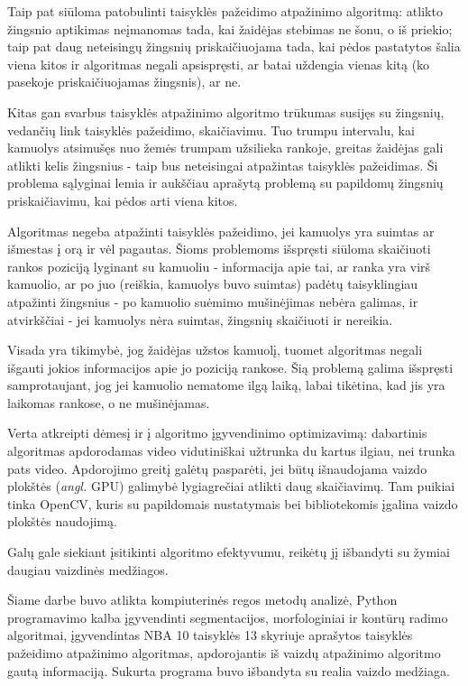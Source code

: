 \documentclass{VUMIFPSkursinis}
\begin{document}
Taip pat siūloma patobulinti taisyklės pažeidimo atpažinimo algoritmą: atlikto žingsnio aptikimas neįmanomas tada, kai žaidėjas stebimas ne šonu, o iš priekio; taip pat daug neteisingų žingsnių priskaičiuojama tada, kai pėdos pastatytos šalia viena kitos ir algoritmas negali apsispręsti, ar batai uždengia vienas kitą (ko pasekoje priskaičiuojamas žingsnis), ar ne.

Kitas gan svarbus taisyklės atpažinimo algoritmo trūkumas susijęs su žingsnių, vedančių link taisyklės pažeidimo, skaičiavimu. Tuo trumpu intervalu, kai kamuolys atsimušęs nuo žemės trumpam užsilieka rankoje, greitas žaidėjas gali atlikti kelis žingsnius - taip bus neteisingai atpažintas taisyklės pažeidimas. Ši problema sąlyginai lemia ir aukščiau aprašytą problemą su papildomų žingsnių priskaičiavimu, kai pėdos arti viena kitos.

Algoritmas negeba atpažinti taisyklės pažeidimo, jei kamuolys yra suimtas ar išmestas į orą ir vėl pagautas. Šioms problemoms išspręsti siūloma skaičiuoti rankos poziciją lyginant su kamuoliu - informacija apie tai, ar ranka yra virš kamuolio, ar po juo (reiškia, kamuolys buvo suimtas) padėtų taisyklingiau atpažinti žingsnius - po kamuolio suėmimo mušinėjimas nebėra galimas, ir atvirkščiai - jei kamuolys nėra suimtas, žingsnių skaičiuoti ir nereikia. 

Visada yra tikimybė, jog žaidėjas užstos kamuolį, tuomet algoritmas negali išgauti jokios informacijos apie jo poziciją rankose. Šią problemą galima išspręsti samprotaujant, jog jei kamuolio nematome ilgą laiką, labai tikėtina, kad jis yra laikomas rankose, o ne mušinėjamas. 

Verta atkreipti dėmesį ir į algoritmo įgyvendinimo optimizavimą: dabartinis algoritmas apdorodamas video vidutiniškai užtrunka du kartus ilgiau, nei trunka pats video. Apdorojimo greitį galėtų pasparėti, jei būtų išnaudojama vaizdo plokštės (\textit{angl.} GPU) galimybė lygiagrečiai atlikti daug skaičiavimų. Tam puikiai tinka OpenCV, kuris su papildomais nustatymais bei bibliotekomis įgalina vaizdo plokštės naudojimą. 

Galų gale siekiant įsitikinti algoritmo efektyvumu, reikėtų jį išbandyti su žymiai daugiau vaizdinės medžiagos. 

Šiame darbe buvo atlikta kompiuterinės regos metodų analizė, Python programavimo kalba įgyvendinti segmentacijos, morfologiniai ir kontūrų radimo algoritmai, įgyvendintas NBA 10 taisyklės 13 skyriuje aprašytos taisyklės pažeidimo atpažinimo algoritmas, apdorojantis iš vaizdų atpažinimo algoritmo gautą informaciją. Sukurta programa buvo išbandyta su realia vaizdo medžiaga.
\end{document}
